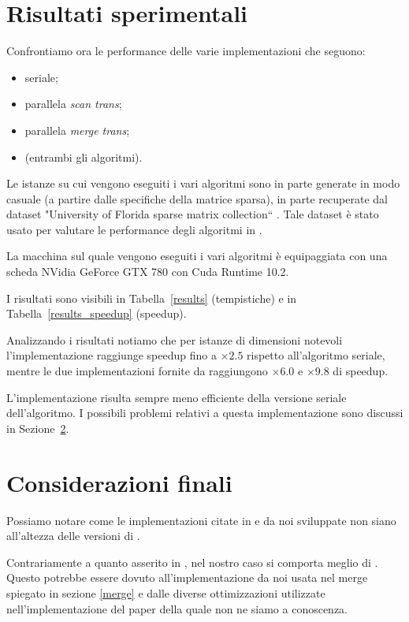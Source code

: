 

\section{Risultati sperimentali}

Confrontiamo ora le performance delle varie implementazioni che seguono:
\begin{itemize}
    \item seriale;
    \item parallela \emph{scan trans};
    \item parallela \emph{merge trans};
    \item \cuSPARSE   (entrambi gli algoritmi).
\end{itemize}

Le istanze su cui vengono eseguiti i vari algoritmi sono in parte generate in modo casuale (a partire dalle specifiche della matrice sparsa), in parte recuperate dal dataset "University  of Florida sparse  matrix collection`` \cite{dataset}. Tale dataset è stato usato per valutare le performance degli algoritmi in \cite{parallelTrans}.

La macchina sul quale vengono eseguiti i vari algoritmi è equipaggiata con una scheda NVidia GeForce GTX 780 con Cuda Runtime 10.2.

I risultati sono visibili in Tabella~\ref{results} (tempistiche) e in Tabella~\ref{results_speedup} (speedup).

Analizzando i risultati notiamo che per istanze di dimensioni notevoli l'implementazione \ScanTrans{} raggiunge speedup fino a $\times 2.5$ rispetto all'algoritmo seriale, mentre le due implementazioni fornite da \cuSPARSE{} raggiungono $\times 6.0$ e $\times 9.8$ di speedup. 

L'implementazione \MergeTrans{} risulta sempre meno efficiente della versione seriale dell'algoritmo. I possibili problemi relativi a questa implementazione sono discussi in Sezione~\ref{conclusioni}.





\section{Considerazioni finali}\label{conclusioni}

Possiamo notare come le implementazioni citate in \cite{parallelTrans} e da noi sviluppate non siano all'altezza delle versioni di \cuSPARSE.

Contrariamente a quanto asserito in \cite{parallelTrans}, nel nostro caso \ScanTrans si comporta meglio di \MergeTrans. Questo potrebbe essere dovuto all'implementazione da noi usata nel merge spiegato in sezione \ref{merge} e dalle diverse ottimizzazioni utilizzate nell'implementazione del paper della quale non ne siamo a conoscenza.

